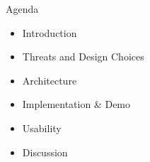 \begin{frame}{Agenda}
    \begin{itemize}
        \item Introduction
        \item Threats and Design Choices
        \item Architecture
        \item Implementation \& Demo
        \item Usability
        \item Discussion
    \end{itemize}
\end{frame}
